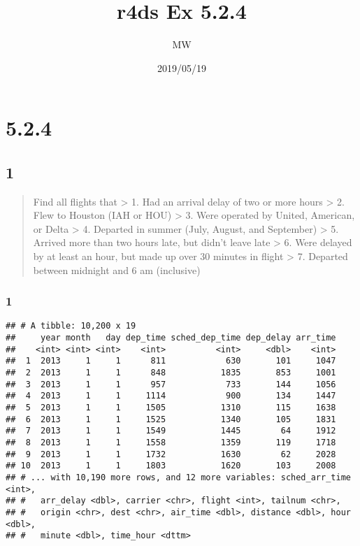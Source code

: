 \documentclass[]{article}
\title{r4ds Ex 5.2.4}
\author{MW}
\date{2019/05/19}
\newenvironment{Shaded}{\begin{snugshade}}{\end{snugshade}}
\newcommand{\DecValTok}[1]{\textcolor[rgb]{0.00,0.00,0.81}{#1}}
\newcommand{\KeywordTok}[1]{\textcolor[rgb]{0.13,0.29,0.53}{\textbf{#1}}}
\newcommand{\NormalTok}[1]{#1}
\newcommand{\OperatorTok}[1]{\textcolor[rgb]{0.81,0.36,0.00}{\textbf{#1}}}
\newcommand{\StringTok}[1]{\textcolor[rgb]{0.31,0.60,0.02}{#1}}
\begin{document}
\maketitle

\hypertarget{section}{%
\section{5.2.4}\label{section}}

\hypertarget{section-1}{%
\subsection{1}\label{section-1}}

\begin{quote}
Find all flights that \textgreater{} 1. Had an arrival delay of two or
more hours \textgreater{} 2. Flew to Houston (IAH or HOU) \textgreater{}
3. Were operated by United, American, or Delta \textgreater{} 4.
Departed in summer (July, August, and September) \textgreater{} 5.
Arrived more than two hours late, but didn't leave late \textgreater{}
6. Were delayed by at least an hour, but made up over 30 minutes in
flight \textgreater{} 7. Departed between midnight and 6 am (inclusive)
\end{quote}

\hypertarget{section-2}{%
\subsubsection{1}\label{section-2}}

\begin{Shaded}
\end{Shaded}

\begin{verbatim}
## # A tibble: 10,200 x 19
##     year month   day dep_time sched_dep_time dep_delay arr_time
##    <int> <int> <int>    <int>          <int>     <dbl>    <int>
##  1  2013     1     1      811            630       101     1047
##  2  2013     1     1      848           1835       853     1001
##  3  2013     1     1      957            733       144     1056
##  4  2013     1     1     1114            900       134     1447
##  5  2013     1     1     1505           1310       115     1638
##  6  2013     1     1     1525           1340       105     1831
##  7  2013     1     1     1549           1445        64     1912
##  8  2013     1     1     1558           1359       119     1718
##  9  2013     1     1     1732           1630        62     2028
## 10  2013     1     1     1803           1620       103     2008
## # ... with 10,190 more rows, and 12 more variables: sched_arr_time <int>,
## #   arr_delay <dbl>, carrier <chr>, flight <int>, tailnum <chr>,
## #   origin <chr>, dest <chr>, air_time <dbl>, distance <dbl>, hour <dbl>,
## #   minute <dbl>, time_hour <dttm>
\end{verbatim}
\end{document}
